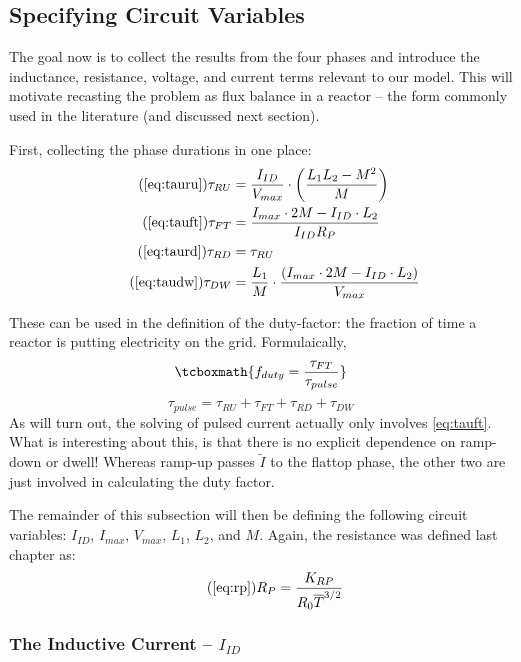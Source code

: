 \subsection{Specifying Circuit Variables}

The goal now is to collect the results from the four phases and introduce the inductance, resistance, voltage, and current terms relevant to our model. This will motivate recasting the problem as flux balance in a reactor -- the form commonly used in the literature (and discussed next section).\cite{process}

First, collecting the phase durations in one place:
\begin{align}
	\tag{\ref{eq:tauru}}
	\tau_{RU} &= \frac{I_{ID}}{V_{max}} \cdot \left( \frac{ L_1 L_2 - M^2 }{ M } \right) \\
	\tag{\ref{eq:tauft}}
	\tau_{FT} &= \frac{ I_{max} \cdot 2 M - I_{ID} \cdot  L_2 }{I_{ID} R_P} \\
	\tag{\ref{eq:taurd}}
	\tau_{RD} &= \tau_{RU} \\
	\tag{\ref{eq:taudw}}
	\tau_{DW} &= \frac{L_1}{M} \cdot \frac{ \left( I_{max} \cdot 2 M - I_{ID} \cdot  L_2 \right) }{V_{max}}
\end{align}

These can be used in the definition of the duty-factor: the fraction of time a reactor is putting electricity on the grid. Formulaically,
\begin{equation}
	\label{eq:duty}
	\tcboxmath{
	f_{duty} = \frac{\tau_{FT}}{\tau_{pulse}}
	}
\end{equation}
\begin{equation}
	\tau_{pulse} = \tau_{RU} + \tau_{FT} + \tau_{RD} + \tau_{DW}
\end{equation}
As will turn out, the solving of pulsed current actually only involves \cref{eq:tauft}. What is interesting about this, is that there is no explicit dependence on ramp-down or dwell! Whereas ramp-up passes $\tilde I$ to the flattop phase, the other two are just involved in calculating the duty factor.

The remainder of this subsection will then be defining the following circuit variables: $I_{ID}$, $I_{max}$, $V_{max}$, $L_1$, $L_2$, and $M$. Again, the resistance was defined last chapter as:
\begin{equation}
	\tag{\ref{eq:rp}}
	R_P = \frac{K_{RP}}{R_0 \overline T ^ {3/2}}
\end{equation}

\subsubsection{The Inductive Current -- $I_{ID}$}

